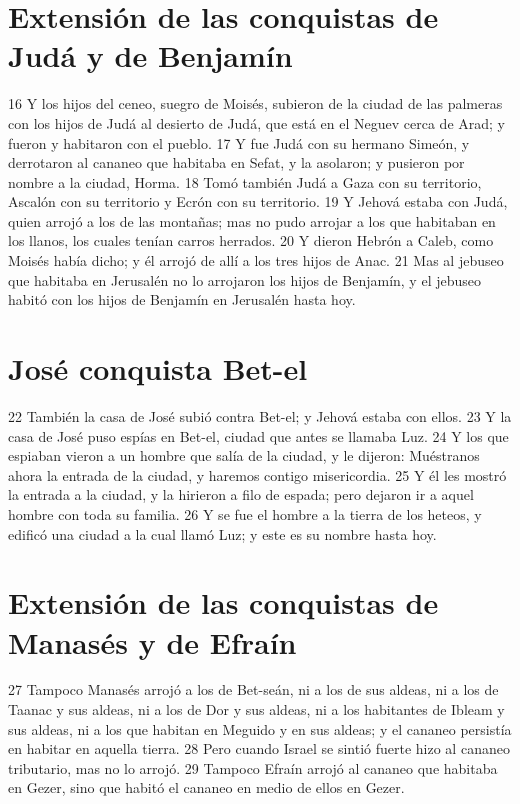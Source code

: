 \section*{Extensión de las conquistas de Judá y de Benjamín}

16 Y los hijos del ceneo, suegro de Moisés, subieron de la ciudad de las palmeras con los hijos de Judá al desierto de Judá, que está en el Neguev cerca de Arad; y fueron y habitaron con el pueblo.
17 Y fue Judá con su hermano Simeón, y derrotaron al cananeo que habitaba en Sefat, y la asolaron; y pusieron por nombre a la ciudad, Horma.
18 Tomó también Judá a Gaza con su territorio, Ascalón con su territorio y Ecrón con su territorio.
19 Y Jehová estaba con Judá, quien arrojó a los de las montañas; mas no pudo arrojar a los que habitaban en los llanos, los cuales tenían carros herrados.
20 Y dieron Hebrón a Caleb, como Moisés había dicho; y él arrojó de allí a los tres hijos de Anac. 
21 Mas al jebuseo que habitaba en Jerusalén no lo arrojaron los hijos de Benjamín, y el jebuseo habitó con los hijos de Benjamín en Jerusalén hasta hoy. 
\section*{José conquista Bet-el}

22 También la casa de José subió contra Bet-el; y Jehová estaba con ellos.
23 Y la casa de José puso espías en Bet-el, ciudad que antes se llamaba Luz.
24 Y los que espiaban vieron a un hombre que salía de la ciudad, y le dijeron: Muéstranos ahora la entrada de la ciudad, y haremos contigo misericordia.
25 Y él les mostró la entrada a la ciudad, y la hirieron a filo de espada; pero dejaron ir a aquel hombre con toda su familia.
26 Y se fue el hombre a la tierra de los heteos, y edificó una ciudad a la cual llamó Luz; y este es su nombre hasta hoy.
\section*{Extensión de las conquistas de Manasés y de Efraín}

27 Tampoco Manasés arrojó a los de Bet-seán, ni a los de sus aldeas, ni a los de Taanac y sus aldeas, ni a los de Dor y sus aldeas, ni a los habitantes de Ibleam y sus aldeas, ni a los que habitan en Meguido y en sus aldeas; y el cananeo persistía en habitar en aquella tierra.
28 Pero cuando Israel se sintió fuerte hizo al cananeo tributario, mas no lo arrojó. 
29 Tampoco Efraín arrojó al cananeo que habitaba en Gezer, sino que habitó el cananeo en medio de ellos en Gezer. 
